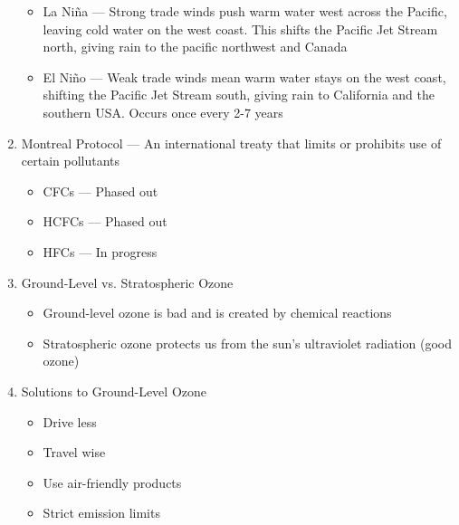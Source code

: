 \documentclass[12pt]{article}
\begin{document}
\begin{enumerate}
\begin{itemize}
      \item La Ni\~na — Strong trade winds push warm water west across the Pacific, leaving cold water on the west coast. This shifts the Pacific Jet Stream north, giving rain to the pacific northwest and Canada

      \item El Ni\~no — Weak trade winds mean warm water stays on the west coast, shifting the Pacific Jet Stream south, giving rain to California and the southern USA. Occurs once every 2-7 years
    \end{itemize}

  \item Montreal Protocol — An international treaty that limits or prohibits use of certain pollutants

    \begin{itemize}

      \item CFCs — Phased out

      \item HCFCs — Phased out

      \item HFCs — In progress

    \end{itemize}

  \item Ground-Level vs. Stratospheric Ozone

    \begin{itemize}

      \item Ground-level ozone is bad and is created by chemical reactions

      \item Stratospheric ozone protects us from the sun's ultraviolet radiation (good ozone)

    \end{itemize}

  \item Solutions to Ground-Level Ozone

    \begin{itemize}

      \item Drive less

      \item Travel wise

      \item Use air-friendly products

      \item Strict  emission limits


\end{itemize}
\end{enumerate}
\end{document}
